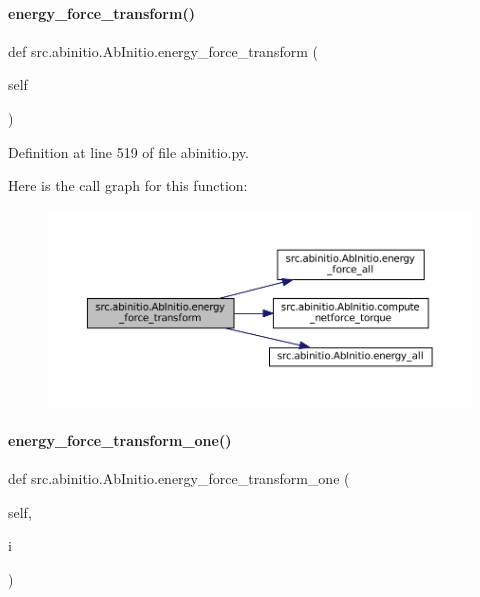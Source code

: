 \paragraph{\texorpdfstring{energy\+\_\+force\+\_\+transform()}{energy\_force\_transform()}}
{\footnotesize\ttfamily def src.\+abinitio.\+Ab\+Initio.\+energy\+\_\+force\+\_\+transform (\begin{DoxyParamCaption}\item[{}]{self }\end{DoxyParamCaption})}



Definition at line 519 of file abinitio.\+py.

Here is the call graph for this function\+:
\nopagebreak
\begin{figure}[H]
\begin{center}
\leavevmode
\includegraphics[width=350pt]{classsrc_1_1abinitio_1_1AbInitio_a2a9c1db3829a4dd66229719fa8e3685a_cgraph}
\end{center}
\end{figure}
\mbox{\label{classsrc_1_1abinitio_1_1AbInitio_a21993fd11a62021d9aa0fe1f4eecd4ad}} 
\paragraph{\texorpdfstring{energy\+\_\+force\+\_\+transform\+\_\+one()}{energy\_force\_transform\_one()}}
{\footnotesize\ttfamily def src.\+abinitio.\+Ab\+Initio.\+energy\+\_\+force\+\_\+transform\+\_\+one (\begin{DoxyParamCaption}\item[{}]{self,  }\item[{}]{i }\end{DoxyParamCaption})}



